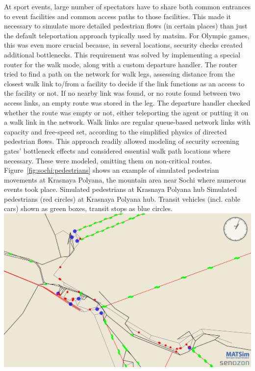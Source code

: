 At sport events, large number of spectators have to share both common entrances
to event facilities and common access paths to those facilities. This
made it necessary to simulate more detailed pedestrian flows (in certain places) 
than just the default \gls{teleportation} approach typically used by
\gls{matsim}. For Olympic games, this was even more crucial because,
in several locations, security checks created additional
bottlenecks. This requirement was solved by implementing a special router for
the walk mode, along with a custom departure handler. The router tried to find a
path on the network for walk legs, assessing distance from the closest walk
link to/from a facility to decide if the link functions as an access to the
facility or not. If no nearby link was found, or no route found between
two access links, an empty route was stored in the leg. The departure handler
checked whether the route was empty or not, either teleporting the agent or putting it
on a walk link in the network. Walk links are regular queue-based network links
with capacity and free-speed set, according to the simplified physics of
directed pedestrian flows. This approach readily allowed modeling of security
screening gates' bottleneck effects and considered essential
walk path locations where necessary. These were modeled, omitting them
on non-critical routes. Figure~\ref{fig:sochi:pedestrians}
shows an example of simulated pedestrian movements at Krasnaya Polyana, the
mountain area near Sochi where numerous events took place.  
%
\createfigure%
{Simulated pedestrians at Krasnaya Polyana hub}%
{Simulated pedestrians (red circles) at Krasnaya Polyana hub. Transit vehicles
(incl. cable cars) shown as green boxes, transit stops as blue circles.}%
{\label{fig:sochi:pedestrians}}%
{\includegraphics[width=1.\textwidth,angle=0]{./scenarios/figures/sochi_pedestrians.pdf}}%
{}
%

